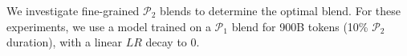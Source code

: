 \documentclass[11pt]{article}
\newcommand{\phaseone}{$\mathcal{P}_1$\xspace}
\newcommand{\phasetwo}{$\mathcal{P}_2$\xspace}
\begin{document}

We investigate fine-grained \phasetwo blends to determine the optimal blend.
For these experiments, we use a model trained on a \phaseone blend for 900B tokens (10\% \phasetwo duration), with a linear $LR$ decay to $0$. %
\end{document}
